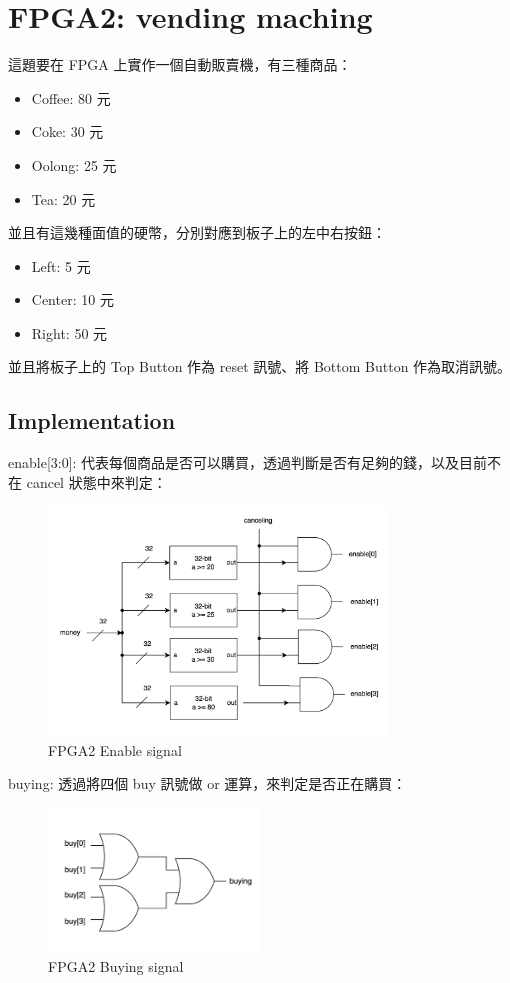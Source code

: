 \documentclass[10.5pt,compsoc,UTF8]{CjC}
\theoremstyle{mystyle}
\begin{document}
\newpage
\section{FPGA2: vending maching}
這題要在 FPGA 上實作一個自動販賣機，有三種商品：
\begin{itemize}
  \item Coffee: 80 元
  \item Coke: 30 元
  \item Oolong: 25 元
  \item Tea: 20 元
\end{itemize}

並且有這幾種面值的硬幣，分別對應到板子上的左中右按鈕：
\begin{itemize}
  \item Left: 5 元
  \item Center: 10 元
  \item Right: 50 元
\end{itemize}

並且將板子上的 Top Button 作為 reset 訊號、將 Bottom  Button 作為取消訊號。

\subsection{Implementation}


enable[3:0]: 代表每個商品是否可以購買，透過判斷是否有足夠的錢，以及目前不在 cancel 狀態中來判定：

\begin{figure}[h!]
  \centering
  \includegraphics[width=0.8\textwidth]{./img/FPGA2-enable.png}
  \caption{FPGA2 Enable signal}
  \label{fig:FPGA2-enable}
\end{figure}

\newpage

buying: 透過將四個 buy 訊號做 or 運算，來判定是否正在購買：
\begin{figure}[h!]
  \centering
  \includegraphics[width=0.5\textwidth]{./img/FPGA2-buying.png}
  \caption{FPGA2 Buying signal}
  \label{fig:FPGA2-buy}
\end{figure}
\end{document}
